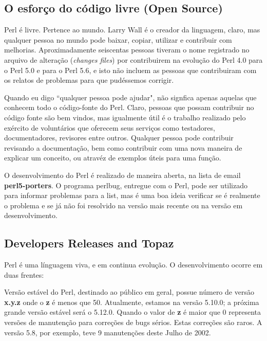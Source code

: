 \documentclass[a4paper,12pt,twoside]{book}
\begin{document}
\subsection{O esfor\c{c}o do código livre (Open Source)}

\noindent Perl é livre. Pertence ao mundo. Larry Wall é o creador da linguagem, claro, mas 
qualquer pessoa no mundo pode baixar, copiar, utilizar e contribuir com melhorias. Aproximadamente 
seiscentas pessoas tiveram o nome registrado no arquivo de alteração (\textit{changes files}) por 
contribuirem na evolução do Perl 4.0 para o Perl 5.0 e para o Perl 5.6, e isto não incluem as 
pessoas que contribuiram com os relatos de problemas para que pudéssemos corrigir.\medskip

\noindent Quando eu digo ``qualquer pessoa pode ajudar", não signfica apenas aquelas que 
conhecem todo o código-fonte do Perl. Claro, pessoas que possam contribuir no código 
fonte são bem vindos, mas igualmente útil é o trabalho realizado pelo exército de voluntários 
que oferecem seus serviços como testadores, documentadores, revisores entre outros. Qualquer 
pessoa pode contribuir revisando a documenta\c{c}ão, bem como contribuir com uma nova maneira 
de explicar um conceito, ou atravéz de exemplos úteis para uma fun\c{c}ão.\medskip

\noindent O desenvolvimento do Perl é realizado de maneira aberta, na lista de email \textbf{perl5-porters}. 
O programa perlbug, entregue com o Perl, pode ser utilizado para informar problemas 
para a list, mas é uma boa ideia verificar se é realmente o problema e se já não foi 
resolvido na versão mais recente ou na versão em desenvolvimento.

\subsection{Developers Releases and Topaz}

\noindent Perl é uma línguagem viva, e em continua evolu\c{c}ão. O desenvolvimento ocorre em duas frentes:\medskip

\noindent Versão estável do Perl, destinado ao público em geral, possue número de 
versão \textbf{x.y.z} onde o \textbf{z} é menos que 50. Atualmente, estamos na versão 
5.10.0; a próxima grande versão estável será o 5.12.0. Quando o valor de \textbf{z} é 
maior que 0 representa versões de manuten\c{c}ão para corre\c{c}ões de bugs sérios. 
Estas corre\c{c}ões são raros. A versão 5.8, por exemplo, teve 9 manuten\c{c}ões deste Julho de 2002.\medskip
\end{document}
